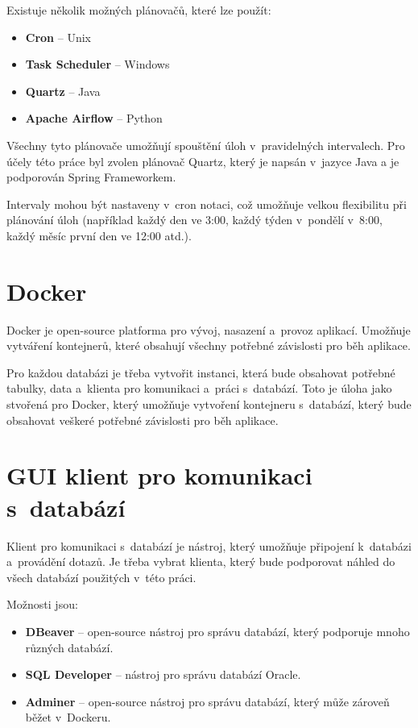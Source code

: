 Existuje několik možných plánovačů, které lze použít:
\begin{itemize}
    \item \textbf{Cron} -- Unix
    \item \textbf{Task Scheduler} -- Windows
    \item \textbf{Quartz} -- Java
    \item \textbf{Apache Airflow} -- Python
\end{itemize}

Všechny tyto plánovače umožňují spouštění úloh v~pravidelných intervalech.  
Pro účely této práce byl zvolen plánovač Quartz, který je napsán v~jazyce Java a  
je podporován Spring Frameworkem.  

Intervaly mohou být nastaveny v~cron notaci, což umožňuje velkou flexibilitu při plánování úloh  
(například každý den ve 3:00, každý týden v~pondělí v~8:00, každý měsíc první den ve 12:00 atd.).

\section{Docker}
Docker je open-source platforma pro vývoj, nasazení a~provoz aplikací.  
Umožňuje vytváření kontejnerů, které obsahují všechny potřebné závislosti pro běh aplikace.  

Pro každou databázi je třeba vytvořit instanci, která bude obsahovat potřebné tabulky, data  
a~klienta pro komunikaci a~práci s~databází. Toto je úloha jako stvořená pro Docker,  
který umožňuje vytvoření kontejneru s~databází, který bude obsahovat veškeré potřebné závislosti  
pro běh aplikace.  
\cite{docker}

\newpage

\section{GUI klient pro komunikaci s~databází}
Klient pro komunikaci s~databází je nástroj, který umožňuje připojení k~databázi a~provádění dotazů.  
Je třeba vybrat klienta, který bude podporovat náhled do všech databází použitých v~této práci.

Možnosti jsou:
\begin{itemize}
    \item \textbf{DBeaver} -- open-source nástroj pro správu databází, který podporuje mnoho různých databází.
    \item \textbf{SQL Developer} -- nástroj pro správu databází Oracle.
    \item \textbf{Adminer} -- open-source nástroj pro správu databází, který může zároveň běžet v~Dockeru.
\end{itemize}

